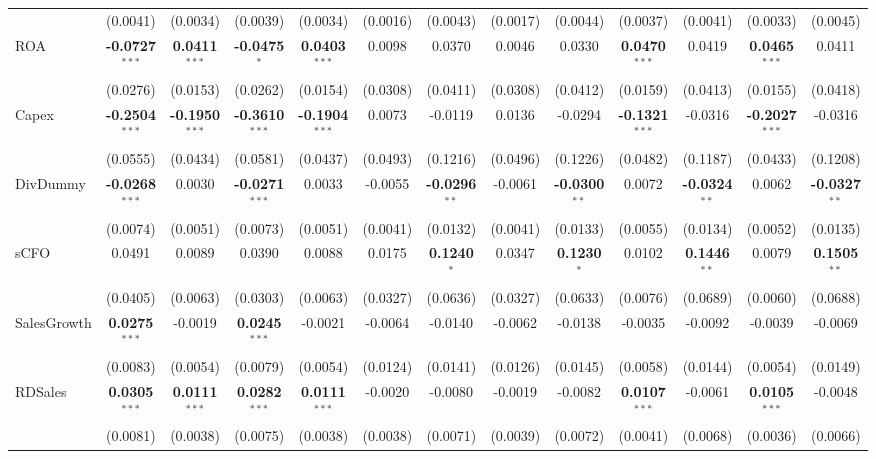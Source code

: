 \begin{landscape}
\begin{table}[H]
\begin{tabular}{lcccccccccccc}
 & (0.0041) & (0.0034) & (0.0039) & (0.0034) & (0.0016) & (0.0043) & (0.0017) & (0.0044) & (0.0037) & (0.0041) & (0.0033) & (0.0045) \\
ROA & \textbf{-0.0727}$^{***}$ & \textbf{0.0411}$^{***}$ & \textbf{-0.0475}$^{*}$ & \textbf{0.0403}$^{***}$ & 0.0098 & 0.0370 & 0.0046 & 0.0330 & \textbf{0.0470}$^{***}$ & 0.0419 & \textbf{0.0465}$^{***}$ & 0.0411 \\
 & (0.0276) & (0.0153) & (0.0262) & (0.0154) & (0.0308) & (0.0411) & (0.0308) & (0.0412) & (0.0159) & (0.0413) & (0.0155) & (0.0418) \\
Capex & \textbf{-0.2504}$^{***}$ & \textbf{-0.1950}$^{***}$ & \textbf{-0.3610}$^{***}$ & \textbf{-0.1904}$^{***}$ & 0.0073 & -0.0119 & 0.0136 & -0.0294 & \textbf{-0.1321}$^{***}$ & -0.0316 & \textbf{-0.2027}$^{***}$ & -0.0316 \\
 & (0.0555) & (0.0434) & (0.0581) & (0.0437) & (0.0493) & (0.1216) & (0.0496) & (0.1226) & (0.0482) & (0.1187) & (0.0433) & (0.1208) \\
DivDummy & \textbf{-0.0268}$^{***}$ & 0.0030 & \textbf{-0.0271}$^{***}$ & 0.0033 & -0.0055 & \textbf{-0.0296}$^{**}$ & -0.0061 & \textbf{-0.0300}$^{**}$ & 0.0072 & \textbf{-0.0324}$^{**}$ & 0.0062 & \textbf{-0.0327}$^{**}$ \\
 & (0.0074) & (0.0051) & (0.0073) & (0.0051) & (0.0041) & (0.0132) & (0.0041) & (0.0133) & (0.0055) & (0.0134) & (0.0052) & (0.0135) \\
sCFO & 0.0491 & 0.0089 & 0.0390 & 0.0088 & 0.0175 & \textbf{0.1240}$^{*}$ & 0.0347 & \textbf{0.1230}$^{*}$ & 0.0102 & \textbf{0.1446}$^{**}$ & 0.0079 & \textbf{0.1505}$^{**}$ \\
 & (0.0405) & (0.0063) & (0.0303) & (0.0063) & (0.0327) & (0.0636) & (0.0327) & (0.0633) & (0.0076) & (0.0689) & (0.0060) & (0.0688) \\
SalesGrowth & \textbf{0.0275}$^{***}$ & -0.0019 & \textbf{0.0245}$^{***}$ & -0.0021 & -0.0064 & -0.0140 & -0.0062 & -0.0138 & -0.0035 & -0.0092 & -0.0039 & -0.0069 \\
 & (0.0083) & (0.0054) & (0.0079) & (0.0054) & (0.0124) & (0.0141) & (0.0126) & (0.0145) & (0.0058) & (0.0144) & (0.0054) & (0.0149) \\
RDSales & \textbf{0.0305}$^{***}$ & \textbf{0.0111}$^{***}$ & \textbf{0.0282}$^{***}$ & \textbf{0.0111}$^{***}$ & -0.0020 & -0.0080 & -0.0019 & -0.0082 & \textbf{0.0107}$^{***}$ & -0.0061 & \textbf{0.0105}$^{***}$ & -0.0048 \\
 & (0.0081) & (0.0038) & (0.0075) & (0.0038) & (0.0038) & (0.0071) & (0.0039) & (0.0072) & (0.0041) & (0.0068) & (0.0036) & (0.0066) \\

\end{tabular}
\end{table}
\end{landscape}
